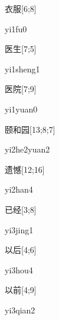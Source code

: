 \begin{verbete}[yi1fu0]{衣服}[6;8]
\begin{pronuncia}{yi1fu0}
\end{pronuncia}
\end{verbete}

\begin{verbete}[yi1sheng1]{医生}[7;5]
\begin{pronuncia}{yi1sheng1}
\end{pronuncia}
\end{verbete}

\begin{verbete}[yi1yuan0]{医院}[7;9]
\begin{pronuncia}{yi1yuan0}
\end{pronuncia}
\end{verbete}

\begin{verbete}[yi2he2yuan2]{颐和园}[13;8;7]
\begin{pronuncia}{yi2he2yuan2}
\end{pronuncia}
\end{verbete}

\begin{verbete}[yi2han4]{遗憾}[12;16]
\begin{pronuncia}{yi2han4}
\end{pronuncia}
\end{verbete}

\begin{verbete}[yi3jing1]{已经}[3;8]
\begin{pronuncia}{yi3jing1}
\end{pronuncia}
\end{verbete}

\begin{verbete}[yi3hou4]{以后}[4;6]
\begin{pronuncia}{yi3hou4}
\end{pronuncia}
\end{verbete}

\begin{verbete}[yi3qian2]{以前}[4;9]
\begin{pronuncia}{yi3qian2}
\end{pronuncia}
\end{verbete}

